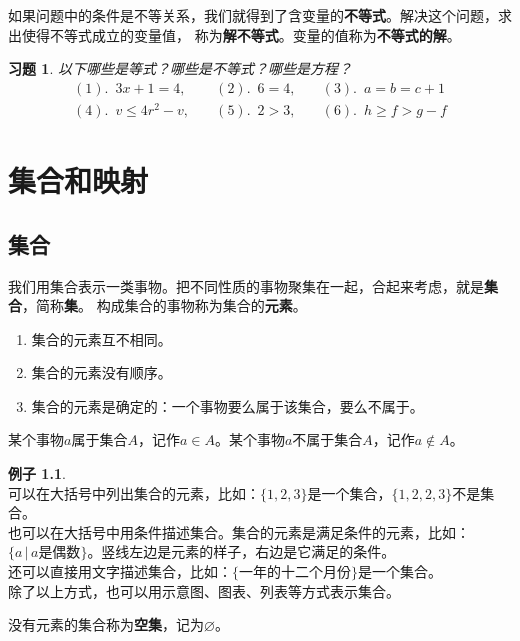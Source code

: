 \documentclass[12pt,UTF8]{ctexbook}
\theoremstyle{definition}
\newtheorem{ex}{例子}[section]
\theoremstyle{plain}
\newtheorem{xt}{习题}[section]
\begin{document}
如果问题中的条件是不等关系，我们就得到了含变量的\textbf{不等式}。解决这个问题，求出使得不等式成立的变量值，
称为\textbf{解不等式}。变量的值称为\textbf{不等式的解}。

\begin{xt}\label{xt:1-2-0}
    以下哪些是等式？哪些是不等式？哪些是方程？
    $$
    \begin{array}{lll}
        (1). \,\,\, 3x + 1 = 4, \quad & (2). \,\,\, 6 = 4, \quad & (3). \,\,\, a = b = c+1  \\
        (4). \,\,\, v \leqslant 4r^2 - v, \quad & (5). \,\,\, 2 > 3, \quad & (6). \,\,\, h \geqslant f > g - f 
    \end{array}
    $$
\end{xt}

\chapter{集合和映射}
\section{集合}
我们用集合表示一类事物。把不同性质的事物聚集在一起，合起来考虑，就是\textbf{集合}，简称\textbf{集}。
构成集合的事物称为集合的\textbf{元素}。
\begin{enumerate}
    \item 集合的元素互不相同。
    \item 集合的元素没有顺序。
    \item 集合的元素是确定的：一个事物要么属于该集合，要么不属于。
\end{enumerate}

某个事物$a$属于集合$A$，记作$a\in A$。某个事物$a$不属于集合$A$，记作$a\notin A$。

\begin{ex}\label{ex:2-0-0}
    \mbox{} \\ 
    \indent 可以在大括号中列出集合的元素，比如：$\{1,2,3\}$是一个集合，$\{1,2,2,3\}$不是集合。 \\
    \indent 也可以在大括号中用条件描述集合。集合的元素是满足条件的元素，比如：$\{ a\, |\, a\mbox{是偶数}\}$。竖线左边是元素的样子，右边是它满足的条件。\\
    \indent 还可以直接用文字描述集合，比如：$\{\mbox{一年的十二个月份}\}$是一个集合。\\
    \indent 除了以上方式，也可以用示意图、图表、列表等方式表示集合。
\end{ex}

没有元素的集合称为\textbf{空集}，记为$\varnothing$。
\end{document}
